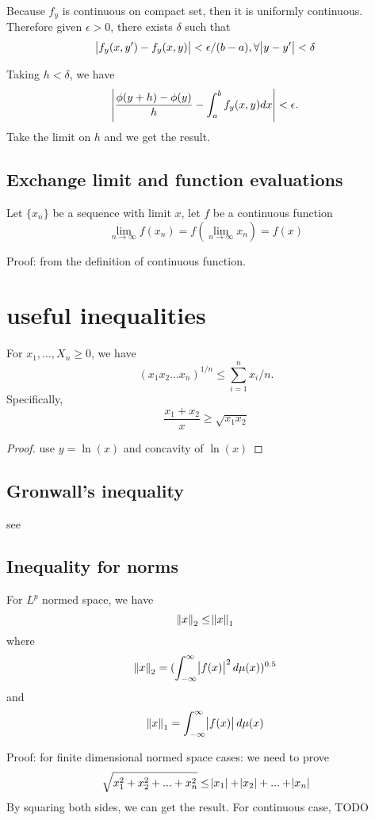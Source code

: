 \begin{refsection}
Because $f_y$ is continuous on compact set, then it is uniformly continuous. Therefore given $\epsilon > 0$, there exists $\delta$ such that
$$\abs{f_y(x,y') - f_y(x,y)} < \epsilon/(b-a), \forall \abs{y-y'}<\delta$$

Taking $h < \delta$, we have 
$$\abs{\frac{\phi(y+h)-\phi(y)}{h} - \int_a^b f_y(x,y) dx} < \epsilon.
$$ Take the limit on $h$ and we get the result. 


\subsection{Exchange limit and function evaluations}
\begin{lemma}
Let $\{x_n\}$ be a sequence with limit $x$, let $f$ be a continuous function
$$\lim_{n\to \infty} f(x_n) = f(\lim_{n\to\infty} x_n) = f(x)$$
\end{lemma}
Proof: from the definition of continuous function.

\section{useful inequalities}

\begin{lemma}
For $x_1,...,X_n \geq 0$, we have
$$(x_1x_2...x_n)^{1/n} \leq \sum_{i=1}^n x_i/n.$$
Specifically,
$$\frac{x_1+x_2}{x} \geq \sqrt{x_1x_2}$$
\end{lemma}
\begin{proof}
use $y = \ln(x)$ and concavity of $\ln(x)$	
\end{proof}


\subsection{Gronwall's inequality}
see \cite{wiki:Gronwall}

\subsection{Inequality for norms}
\begin{lemma}
 \cite{wiki:Lpspace}For $L^p$ normed space, we have
$$\norm{x}_2 \leq \norm{x}_1$$
where
$$\norm{x}_2 = (\int_{-\infty}^\infty \abs{f(x)}^2 d\mu(x))^{0.5}$$
and
$$\norm{x}_1 = \int_{-\infty}^\infty \abs{f(x)} d\mu(x)$$
\end{lemma}
Proof: for finite dimensional normed space cases: we need to prove
$$\sqrt{x_1^2 + x_2^2 + ... + x_n^2} \leq \abs{x_1} + \abs{x_2} + ... + \abs{x_n}$$
By squaring both sides, we can get the result. For continuous case, TODO



\end{refsection}
